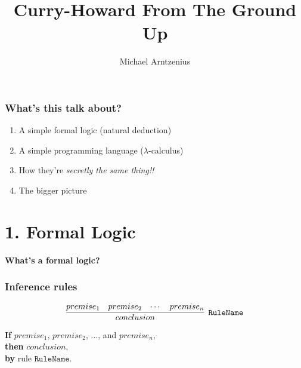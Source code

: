 \documentclass{beamer}
\title{Curry-Howard From The Ground Up}
\author{Michael Arntzenius}
\begin{document}
\begin{frame}
  \titlepage
\end{frame}


\begin{frame}
  \frametitle{What's this talk about?}
  \begin{enumerate}
  \item A simple formal logic (natural deduction)
  \item A simple programming language ($\lambda$-calculus)
  \item How they're \emph{secretly the same thing!!}
  \item The bigger picture %
  \end{enumerate}
\end{frame}


\section{1. Formal Logic}


\begin{frame}

  \begin{center}
    {\Large\bf What's a formal logic?}
  \end{center}

\end{frame}

\newcommand{\rn}[1]{\ensuremath{\mathtt{#1}}}

\begin{frame}
  \frametitle{Inference rules}


  \[
  \infer[\rn{RuleName}]{conclusion}{premise_1 & premise_2 & \cdots & premise_n}
  \]

  \textbf{If} $premise_1$, $premise_2$, ..., and $premise_n$,\\
  \textbf{then} $conclusion$,\\
  \textbf{by} rule $\rn{RuleName}$.
\end{frame}
\end{document}
